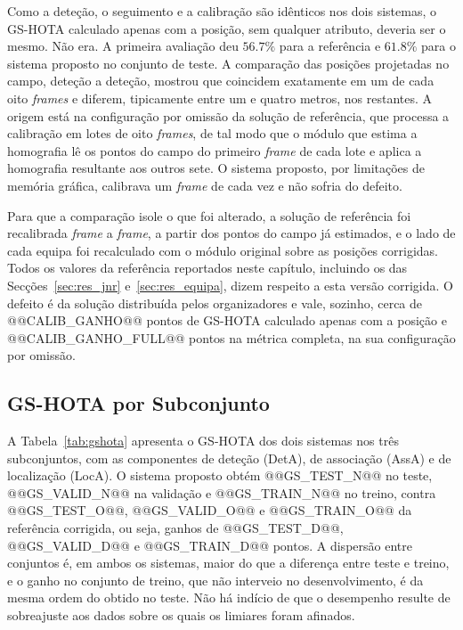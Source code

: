 Como a deteção, o seguimento e a calibração são idênticos nos dois sistemas, o GS-HOTA calculado
apenas com a posição, sem qualquer atributo, deveria ser o mesmo. Não era. A primeira avaliação
deu $56.7\%$ para a referência e $61.8\%$ para o sistema proposto no conjunto de teste. A
comparação das posições projetadas no campo, deteção a deteção, mostrou que coincidem exatamente
em um de cada oito \emph{frames} e diferem, tipicamente entre um e quatro metros, nos restantes. A
origem está na configuração por omissão da solução de referência, que processa a calibração em
lotes de oito \emph{frames}, de tal modo que o módulo que estima a homografia lê os pontos do campo do primeiro
\emph{frame} de cada lote e aplica a homografia resultante aos outros sete. O sistema proposto,
por limitações de memória gráfica, calibrava um \emph{frame} de cada vez e não sofria do defeito.

Para que a comparação isole o que foi alterado, a solução de referência foi recalibrada
\emph{frame} a \emph{frame}, a partir dos pontos do campo já estimados, e o lado de cada equipa foi
recalculado com o módulo original sobre as posições corrigidas. Todos os valores da referência
reportados neste capítulo, incluindo os das Secções~\ref{sec:res_jnr} e~\ref{sec:res_equipa}, dizem
respeito a esta versão corrigida. O defeito é da solução distribuída pelos organizadores e vale,
sozinho, cerca de @@CALIB_GANHO@@ pontos de GS-HOTA calculado apenas com a posição e
@@CALIB_GANHO_FULL@@ pontos na métrica completa, na sua configuração por omissão.

\subsection{GS-HOTA por Subconjunto}\label{sec:res_gshota}

A Tabela~\ref{tab:gshota} apresenta o GS-HOTA dos dois sistemas nos três subconjuntos, com as
componentes de deteção (DetA), de associação (AssA) e de localização (LocA). O sistema proposto
obtém @@GS_TEST_N@@ no teste, @@GS_VALID_N@@ na validação e @@GS_TRAIN_N@@ no treino, contra
@@GS_TEST_O@@, @@GS_VALID_O@@ e @@GS_TRAIN_O@@ da referência corrigida, ou seja, ganhos de
@@GS_TEST_D@@, @@GS_VALID_D@@ e @@GS_TRAIN_D@@ pontos. A dispersão entre conjuntos é, em ambos os
sistemas, maior do que a diferença entre teste e treino, e o ganho no conjunto de treino, que não
interveio no desenvolvimento, é da mesma ordem do obtido no teste. Não há indício de que o
desempenho resulte de sobreajuste aos dados sobre os quais os limiares foram afinados.

